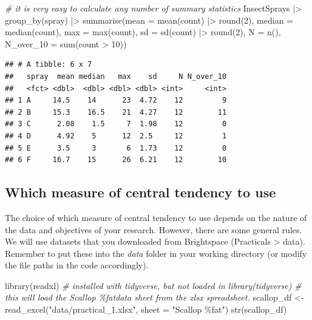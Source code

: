 \documentclass[
  11pt,
  a4paper,
]{book}
\newenvironment{Shaded}{\begin{snugshade}}{\end{snugshade}}
\newcommand{\AttributeTok}[1]{\textcolor[rgb]{0.77,0.63,0.00}{#1}}
\newcommand{\CommentTok}[1]{\textcolor[rgb]{0.56,0.35,0.01}{\textit{#1}}}
\newcommand{\DecValTok}[1]{\textcolor[rgb]{0.00,0.00,0.81}{#1}}
\newcommand{\FunctionTok}[1]{\textcolor[rgb]{0.00,0.00,0.00}{#1}}
\newcommand{\NormalTok}[1]{#1}
\newcommand{\OtherTok}[1]{\textcolor[rgb]{0.56,0.35,0.01}{#1}}
\newcommand{\SpecialCharTok}[1]{\textcolor[rgb]{0.00,0.00,0.00}{#1}}
\newcommand{\StringTok}[1]{\textcolor[rgb]{0.31,0.60,0.02}{#1}}
\begin{document}
\begin{Shaded}
\begin{Highlighting}[]
\CommentTok{\# it is very easy to calculate any number of summary statistics}
\NormalTok{InsectSprays }\SpecialCharTok{|\textgreater{}}
  \FunctionTok{group\_by}\NormalTok{(spray) }\SpecialCharTok{|\textgreater{}}
  \FunctionTok{summarise}\NormalTok{(}\AttributeTok{mean =} \FunctionTok{mean}\NormalTok{(count) }\SpecialCharTok{|\textgreater{}} \FunctionTok{round}\NormalTok{(}\DecValTok{2}\NormalTok{),}
            \AttributeTok{median =} \FunctionTok{median}\NormalTok{(count),}
            \AttributeTok{max =} \FunctionTok{max}\NormalTok{(count),}
            \AttributeTok{sd =} \FunctionTok{sd}\NormalTok{(count) }\SpecialCharTok{|\textgreater{}} \FunctionTok{round}\NormalTok{(}\DecValTok{2}\NormalTok{),}
            \AttributeTok{N =} \FunctionTok{n}\NormalTok{(),}
            \AttributeTok{N\_over\_10 =} \FunctionTok{sum}\NormalTok{(count }\SpecialCharTok{\textgreater{}} \DecValTok{10}\NormalTok{))}
\end{Highlighting}
\end{Shaded}

\begin{verbatim}
## # A tibble: 6 x 7
##   spray  mean median   max    sd     N N_over_10
##   <fct> <dbl>  <dbl> <dbl> <dbl> <int>     <int>
## 1 A     14.5    14      23  4.72    12         9
## 2 B     15.3    16.5    21  4.27    12        11
## 3 C      2.08    1.5     7  1.98    12         0
## 4 D      4.92    5      12  2.5     12         1
## 5 E      3.5     3       6  1.73    12         0
## 6 F     16.7    15      26  6.21    12        10
\end{verbatim}

\hypertarget{which-measure-of-central-tendency-to-use}{%
\subsection{Which measure of central tendency to use}\label{which-measure-of-central-tendency-to-use}}

The choice of which measure of central tendency to use depends on the nature of the data and objectives of your research. However, there are some general rules. We will use datasets that you downloaded from Brightspace (Practicals \textgreater{} data). Remember to put these into the \emph{data} folder in your working directory (or modify the file paths in the code accordingly).

\begin{Shaded}
\begin{Highlighting}[]
\FunctionTok{library}\NormalTok{(readxl) }\CommentTok{\# installed with tidyverse, but not loaded in library(tidyverse)}
\CommentTok{\# this will load the \textquotesingle{}Scallop \%fat\textquotesingle{}data sheet from the xlsx spreadsheet.}
\NormalTok{scallop\_df }\OtherTok{\textless{}{-}} \FunctionTok{read\_excel}\NormalTok{(}\StringTok{"data/practical\_1.xlsx"}\NormalTok{, }\AttributeTok{sheet =} \StringTok{"Scallop \%fat"}\NormalTok{)}
\FunctionTok{str}\NormalTok{(scallop\_df)}
\end{Highlighting}
\end{Shaded}
\end{document}
